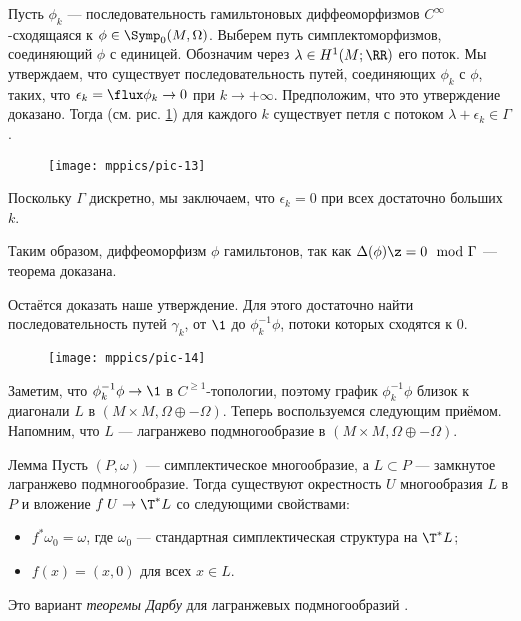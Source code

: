 Пусть $\phi_k$ — последовательность гамильтоновых диффеоморфизмов $C^\infty$-сходящаяся к $\phi\in\Symp_0(M,\Omega)$.
Выберем путь симплектоморфизмов, соединяющий $\phi$ с единицей.
Обозначим через $\lambda \in H^1 (M;\RR)$ его поток.
Мы утверждаем, что существует последовательность путей, соединяющих $\phi_k$ с $\phi$, 
таких, что $\epsilon_k=\flux \phi_k\to 0$ при $k\to +\infty$.
Предположим, что это утверждение доказано.
Тогда (см. рис. \ref{pic-13}) для каждого $k$ существует петля с потоком $\lambda + \epsilon_k\in \Gamma$.
\begin{figure}[ht!]
\centering
\texttt{[image: mppics/pic-13]}
\caption{}\label{pic-13}
\vskip0mm
\end{figure}
Поскольку $\Gamma$ дискретно, мы заключаем, что $\epsilon_k=0$ при всех достаточно больших $k$.



Таким образом, диффеоморфизм $\phi$ гамильтонов, так как $\Delta(\phi) \z= 0 \mod{\Gamma}$  — теорема доказана.

Остаётся доказать наше утверждение.
Для этого достаточно найти последовательность путей $\gamma_k$, от
$\1$ до $\phi_k^{-1}\phi$, потоки которых сходятся к $0$.

\begin{figure}[ht!]
\centering
\texttt{[image: mppics/pic-14]}
\caption{}\label{pic-14}
\vskip0mm
\end{figure}

Заметим, что $\phi_k^{-1}\phi \to \1$ в $C^{\geq1}$-топологии, поэтому график
$\phi_k^{-1}\phi$ близок к диагонали $L$ в $(M \times M, \Omega \oplus
-\Omega)$. 
Теперь воспользуемся следующим приёмом.
Напомним, что $L$ — лагранжево подмногообразие в $(M \times M,
\Omega \oplus -\Omega)$.

\begin{thm}{Лемма}
Пусть $(P, \omega)$ — симплектическое многообразие, а $L\subset P$
— замкнутое лагранжево подмногообразие. 
Тогда существуют окрестность $U$ многообразия $L$ в $P$ и вложение
$f\: U \to \T^\ast L$ со следующими свойствами: 
\begin{itemize}
\item $f^\ast\omega_0 = \omega$, где $\omega_0$ — стандартная симплектическая структура на $\T^\ast L$;
\item $f(x) = (x,0)$ для всех $x\in L$.
\end{itemize}
\end{thm}
Это вариант \emph{теоремы Дарбу} для лагранжевых
подмногообразий \cite{MS}. 


